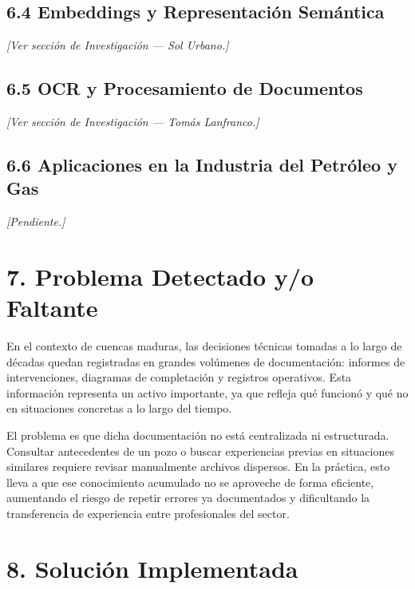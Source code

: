 \documentclass[12pt, a4paper]{report}
\begin{document}
\section*{6.4 Embeddings y Representación Semántica}

\textit{[Ver sección de Investigación --- Sol Urbano.]}

\section*{6.5 OCR y Procesamiento de Documentos}

\textit{[Ver sección de Investigación --- Tomás Lanfranco.]}

\section*{6.6 Aplicaciones en la Industria del Petróleo y Gas}

\textit{[Pendiente.]}

\chapter*{7. Problema Detectado y/o Faltante}

En el contexto de cuencas maduras, las decisiones técnicas tomadas a lo largo de décadas
quedan registradas en grandes volúmenes de documentación: informes de intervenciones,
diagramas de completación y registros operativos. Esta información representa un activo
importante, ya que refleja qué funcionó y qué no en situaciones concretas a lo largo del tiempo.

El problema es que dicha documentación no está centralizada ni estructurada. Consultar
antecedentes de un pozo o buscar experiencias previas en situaciones similares requiere revisar
manualmente archivos dispersos. En la práctica, esto lleva a que ese conocimiento acumulado no
se aproveche de forma eficiente, aumentando el riesgo de repetir errores ya documentados y
dificultando la transferencia de experiencia entre profesionales del sector.

\chapter*{8. Solución Implementada}
\end{document}
